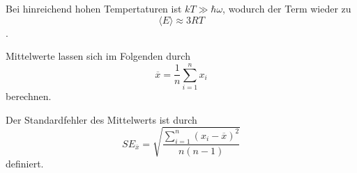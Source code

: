 Bei hinreichend hohen Tempertaturen ist $k T \gg \hbar \omega$, wodurch der Term wieder zu 
\begin{equation}
    \langle E \rangle \approx 3 R T
\end{equation}.


Mittelwerte lassen sich im Folgenden durch 
\begin{equation}
    \overline{x} = \frac{1}n \sum_{i=1}^n x_i
    \label{eqn:mid}
\end{equation}
berechnen. 

Der Standardfehler des Mittelwerts ist durch 
\begin{equation}
    SE_{\overline{x}} = \sqrt{\frac{\sum_{i=1}^n(x_i - \overline{x})^2}{n(n-1)}}
    \label{eqn:sem}
\end{equation}
definiert.


